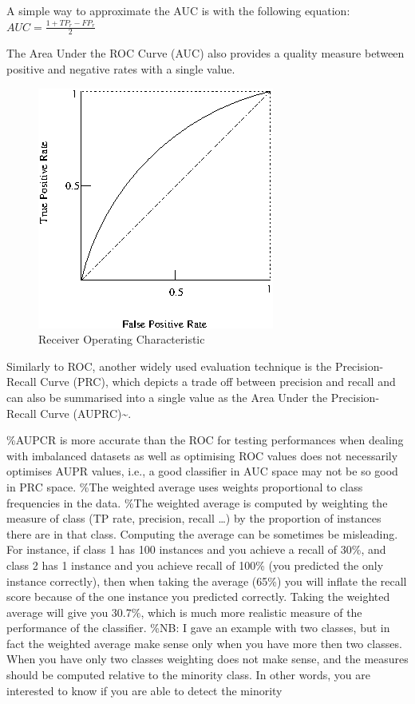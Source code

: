 \documentclass[]{book}
\begin{document}
A simple way to approximate the AUC is with the following equation:
\(AUC=\frac{1+TP_{r}-FP_{r}}{2}\)

The Area Under the ROC Curve (AUC) also provides a quality measure
between positive and negative rates with a single value.

\begin{figure}[htbp]
\centering
\includegraphics{figures/roc.png}
\caption{Receiver Operating Characteristic}
\end{figure}

Similarly to ROC, another widely used evaluation technique is the
Precision-Recall Curve (PRC), which depicts a trade off between
precision and recall and can also be summarised into a single value as
the Area Under the Precision-Recall Curve
(AUPRC)\textasciitilde{}\cite{Davis2006}.

\%AUPCR is more accurate than the ROC for testing performances when
dealing with imbalanced datasets as well as optimising ROC values does
not necessarily optimises AUPR values, i.e., a good classifier in AUC
space may not be so good in PRC space. \%The weighted average uses
weights proportional to class frequencies in the data. \%The weighted
average is computed by weighting the measure of class (TP rate,
precision, recall \ldots{}) by the proportion of instances there are in
that class. Computing the average can be sometimes be misleading. For
instance, if class 1 has 100 instances and you achieve a recall of 30\%,
and class 2 has 1 instance and you achieve recall of 100\% (you
predicted the only instance correctly), then when taking the average
(65\%) you will inflate the recall score because of the one instance you
predicted correctly. Taking the weighted average will give you 30.7\%,
which is much more realistic measure of the performance of the
classifier. \%NB: I gave an example with two classes, but in fact the
weighted average make sense only when you have more then two classes.
When you have only two classes weighting does not make sense, and the
measures should be computed relative to the minority class. In other
words, you are interested to know if you are able to detect the minority
\end{document}

